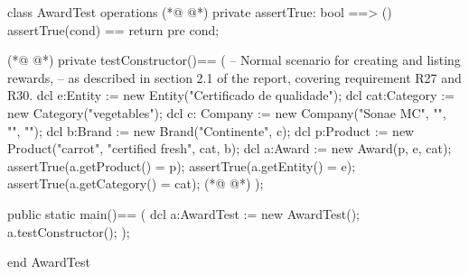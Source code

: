 \begin{vdmpp}[breaklines=true]
class AwardTest
 operations
(*@
\label{assertTrue:3}
@*)
  private assertTrue: bool ==> ()
    assertTrue(cond) == return
    pre cond;
    
(*@
\label{testConstructor:7}
@*)
  private testConstructor()==
  (
    -- Normal scenario for creating and listing rewards,
     -- as described in section 2.1 of the report, covering requirement R27 and R30.
   dcl e:Entity := new Entity("Certificado de qualidade");
   dcl cat:Category := new Category("vegetables"); 
      dcl c: Company := new Company("Sonae MC", "", "", "");
   dcl b:Brand := new Brand("Continente", c);
   dcl p:Product := new Product("carrot", "certified fresh", cat, b);
   dcl a:Award := new Award(p, e, cat);
   assertTrue(a.getProduct() = p);
   assertTrue(a.getEntity() = e);
   assertTrue(a.getCategory() = cat);
(*@
\label{main:20}
@*)
  );
  
  public static main()==
    (
   dcl a:AwardTest := new AwardTest();
   a.testConstructor();
    );
     
end AwardTest
\end{vdmpp}
